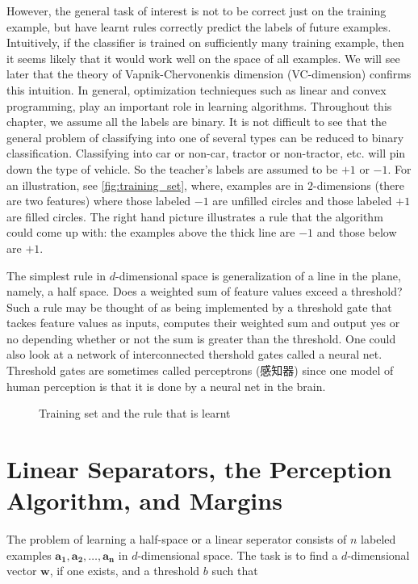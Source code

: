 However, the general task of interest is not to be correct just on the training example, but have learnt rules correctly predict the labels of future examples. Intuitively, if the classifier is trained on sufficiently many training example, then it seems likely that it would work well on the space of all examples. We will see later that the theory of Vapnik-Chervonenkis dimension (VC-dimension) confirms this intuition. In general, optimization technieques such as linear and convex programming, play an important role in learning algorithms. Throughout this chapter, we assume all the labels are binary. It is not difficult to see that the general problem of classifying into one of several types can be reduced to binary classification. Classifying into car or non-car, tractor or non-tractor, etc. will pin down the type of vehicle. So the teacher's labels are assumed to be \(+1\) or \(-1\). For an illustration, see \autoref{fig:training_set}, where, examples are in \(2\)-dimensions (there are two features) where those labeled \(-1\) are unfilled circles and those labeled \(+1\) are filled circles. The right hand picture illustrates a rule that the algorithm could come up with: the examples above the thick line are \(-1\) and those below are \(+1\). 

The simplest rule in \(d\)-dimensional space is generalization of a line in the plane, namely, a half space. Does a weighted sum of feature values exceed a threshold? Such a rule may be thought of as being implemented by a threshold gate that tackes feature values as inputs, computes their weighted sum and output yes or no depending whether or not the sum is greater than the threshold. One could also look at a network of interconnected thershold gates called a neural net. Threshold gates are sometimes called perceptrons (感知器) since one model of human perception is that it is done by a neural net in the brain.  

\begin{figure}[H]
    \centering
    \caption{Training set and the rule that is learnt}
    \label{fig:training_set}
\end{figure}

\section{Linear Separators, the Perception Algorithm, and Margins}

The problem of learning a half-space or a linear seperator consists of \(n\) labeled examples \(\mathbf{a_1}, \mathbf{a_2}, \dots , \mathbf{a_n}\) in \(d\)-dimensional space. The task is to find a \(d\)-dimensional vector \(\mathbf{w} \), if one exists, and a threshold \(b\) such that

